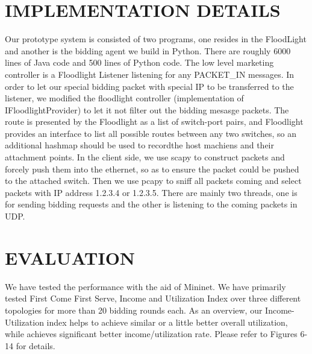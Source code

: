 \documentclass[a4paper,11pt,twocolumn]{article}
\begin{document}
% 
% 





\section{IMPLEMENTATION DETAILS}
Our prototype system is consisted of two programs, one resides in the FloodLight and another is the bidding agent we build in Python. There are roughly 
6000 lines of Java code and 500 lines of Python code. The low level marketing controller is a Floodlight Listener listening for any PACKET\_IN messages.
In order to let our special bidding packet with special IP to be transferred to the listener, we modified the floodlight controller (implementation 
of IFloodlightProvider) to let it not filter out the bidding mesasge packets. The route is presented by the Floodlight as a list of switch-port pairs,
and Floodlight provides an interface to list all possible routes between any two switches, so an additional hashmap should be used to recordthe host machiens
and their attachment points. In the client side, we use scapy to construct packets and forcely push them into the ethernet, so as to ensure the packet 
could be pushed to the attached switch. Then we use pcapy to sniff all packets coming and select packets with IP address 1.2.3.4 or 1.2.3.5. There are mainly
two threads, one is for sending bidding requests and the other is listening to the coming packets in UDP. 


\section{EVALUATION}
We have tested the performance with the aid of Mininet\cite{mininet}. We have primarily tested First Come First Serve, Income and Utilization Index over three different topologies for more than 20 bidding rounds each.  As an overview,  our Income-Utilization index helps to achieve similar or a little better overall utilization, while achieves significant better income/utilization rate. Please refer to Figures 6-14 for details.
\end{document}
